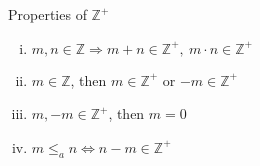 \documentclass[8pt]{extarticle}
\newcommand{\Z}{\mathbb{Z}}
\begin{document}
  \begin{problem}{Properties of $\Z^+$}
    \begin{enumerate}[(i)]
      \item $m,n\in \Z\Rightarrow m+n\in\Z^+,~m\cdot n\in \Z^+$
      \item $m\in \Z$, then $m\in \Z^+$ or $-m\in\Z^+$
      \item $m,-m\in \Z^+$, then $m=0$
      \item $m\leq_a n \Leftrightarrow n-m\in\Z^+$
    \end{enumerate}
  \end{problem}
\end{document}
